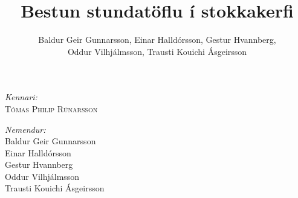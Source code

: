 \documentclass[a4paper,12pt]{article}
\begin{document}
\begin{titlepage}
\begin{center}
\begin{minipage}{0.4\textwidth}
\begin{flushleft} 
\vspace{1cm}
\emph{Kennari:}\\
\textsc{Tómas Philip Rúnarsson}\\
\end{flushleft}
\end{minipage}
\begin{minipage}{0.4\textwidth}
\begin{flushright} 
\emph{Nemendur:}\\
Baldur Geir Gunnarsson\\
Einar Halldórsson\\
Gestur Hvannberg\\
Oddur Vilhjálmsson\\
Trausti Kouichi Ásgeirsson
\end{flushright}
\end{minipage}

\end{center}

\newpage
\thispagestyle{empty} \mbox{}
\vfill
\vfill 
\thispagestyle{empty}
\cleardoublepage



\end{titlepage}

\title{Bestun stundatöflu í stokkakerfi}
\author{Baldur Geir Gunnarsson, Einar Halldórsson, Gestur Hvannberg,\\ Oddur Vilhjálmsson, Trausti Kouichi Ásgeirsson}
\maketitle
\end{document}

